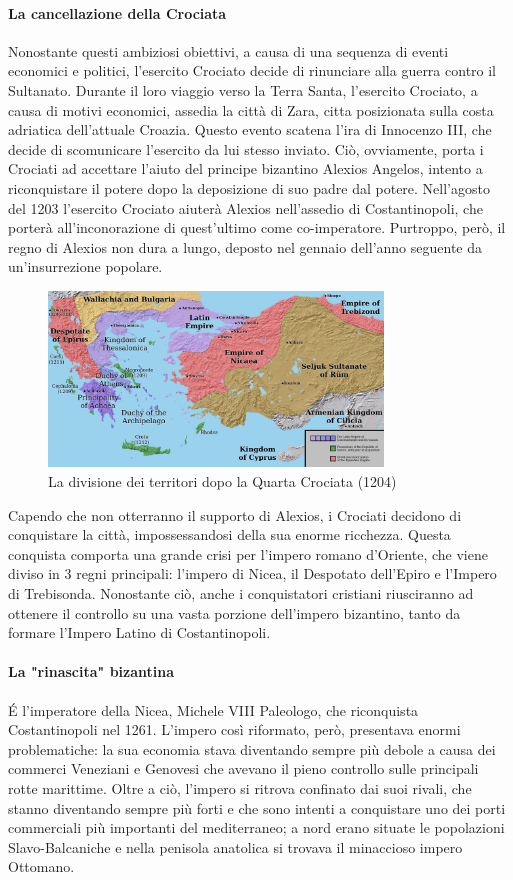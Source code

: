 \documentclass[11pt]{report}
\begin{document}
	\paragraph*{La cancellazione della Crociata}Nonostante questi ambiziosi obiettivi, a causa di una sequenza di eventi economici e politici, l'esercito Crociato decide di rinunciare alla guerra contro il Sultanato. Durante il loro viaggio verso la Terra Santa, l'esercito Crociato, a causa di motivi economici, assedia la città di Zara, citta posizionata sulla costa adriatica dell'attuale Croazia. Questo evento scatena l'ira di Innocenzo III, che decide di scomunicare l'esercito da lui stesso inviato. Ciò, ovviamente, porta i Crociati ad accettare l'aiuto del principe bizantino Alexios Angelos, intento a riconquistare il potere dopo la deposizione di suo padre dal potere. Nell'agosto del 1203 l'esercito Crociato aiuterà Alexios nell'assedio di Costantinopoli, che porterà all'inconorazione di quest'ultimo come co-imperatore. Purtroppo, però, il regno di Alexios non dura a lungo, deposto nel gennaio dell'anno seguente da un'insurrezione popolare. 
	
	\begin{figure}
		\includegraphics[width=3.5in]{"LatinEmpire2"}
		\caption{{\small La divisione dei territori dopo la Quarta Crociata (1204)}}
	\end{figure} 
	
	Capendo che non otterranno il supporto di Alexios, i Crociati decidono di conquistare la città, impossessandosi della sua enorme ricchezza. Questa conquista comporta una grande crisi per l'impero romano d'Oriente, che viene diviso in 3 regni principali: l'impero di Nicea, il Despotato dell'Epiro e l'Impero di Trebisonda. Nonostante ciò, anche i conquistatori cristiani riusciranno ad ottenere il controllo su una vasta porzione dell'impero bizantino, tanto da formare l'Impero Latino di Costantinopoli.
	
	\paragraph*{La "rinascita" bizantina}É l'imperatore della Nicea, Michele VIII Paleologo, che riconquista Costantinopoli nel 1261. L'impero così riformato, però, presentava enormi problematiche: la sua economia stava diventando sempre più debole a causa dei commerci Veneziani e Genovesi che avevano il pieno controllo sulle principali rotte marittime. Oltre a ciò, l'impero si ritrova confinato dai suoi rivali, che stanno diventando sempre più forti e che sono intenti a conquistare uno dei porti commerciali più importanti del mediterraneo; a nord erano situate le popolazioni Slavo-Balcaniche e nella penisola anatolica si trovava il minaccioso impero Ottomano.
	
\end{document}
